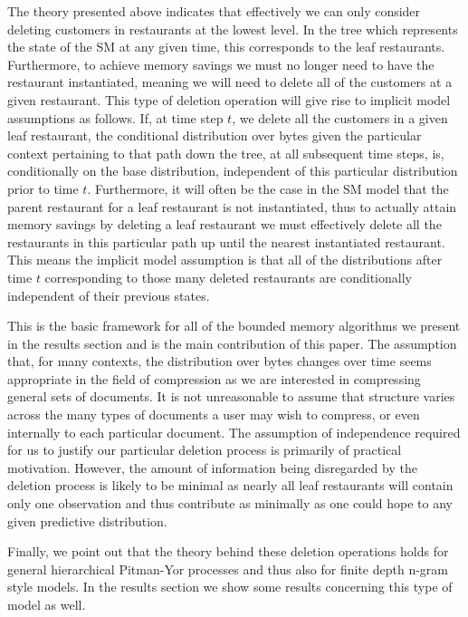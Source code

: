 \documentclass{article}
\begin{document}
The theory presented above indicates that effectively we can only consider deleting customers in restaurants at the lowest level.  In the tree which represents the state of the SM at any given time, this corresponds to the leaf restaurants.  Furthermore, to achieve memory savings we must no longer need to have the restaurant instantiated, meaning we will need to delete all of the customers at a given restaurant.  This type of deletion operation will give rise to implicit model assumptions as follows. If, at time step $t$, we delete all the customers in a given leaf restaurant, the conditional distribution over bytes given the particular context pertaining to that path down the tree, at all subsequent time steps, is, conditionally on the base distribution, independent of this particular distribution prior to time $t$.  Furthermore, it will often be the case in the SM model that the parent restaurant for a leaf restaurant is not instantiated, thus to actually attain memory savings by deleting a leaf restaurant we must effectively delete all the restaurants in this particular path up until the nearest instantiated restaurant.  This means the implicit model assumption is that all of the distributions after time $t$ corresponding to those many deleted restaurants are conditionally independent of their previous states.

This is the basic framework for all of the bounded memory algorithms we present in the results section and is the main contribution of this paper.  The assumption that, for many contexts, the distribution over bytes changes over time seems appropriate in the field of compression as we are interested in compressing general sets of documents. It is not unreasonable to assume that structure varies across the many types of documents a user may wish to compress, or even internally to each particular document.  The assumption of independence required for us to justify our particular deletion process is primarily of practical motivation.  However, the amount of information being disregarded by the deletion process is likely to be minimal as nearly all leaf restaurants will contain only one observation and thus contribute as minimally as one could hope to any given predictive distribution.

Finally, we point out that the theory behind these deletion operations holds for general hierarchical Pitman-Yor processes and thus also for finite depth n-gram style models.  In the results section we show some results concerning this type of model as well.
\end{document}
